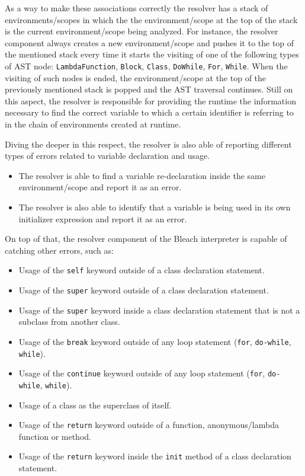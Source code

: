 As a way to make these associations correctly the resolver has a stack of environments/scopes in which the the environment/scope at the top of the stack is the current environment/scope being analyzed. For instance, the resolver component always creates a new environment/scope and pushes it to the top of the mentioned stack every time it starts the visiting of one of the following types of AST node: \texttt{LambdaFunction}, \texttt{Block}, \texttt{Class}, \texttt{DoWhile}, \texttt{For}, \texttt{While}. When the visiting of such nodes is ended, the environment/scope at the top of the previously mentioned stack is popped and the AST traversal continues. Still on this aspect, the resolver is responsible for providing the runtime the information necessary to find the correct variable to which a certain identifier is referring to in the chain of environments created at runtime.

Diving the deeper in this respect, the resolver is also able of reporting different types of errors related to variable declaration and usage.
\begin{itemize}
    \item The resolver is able to find a variable re-declaration inside the same environment/scope and report it as an error.
    \item The resolver is also able to identify that a variable is being used in its own initializer expression and report it as an error.   
\end{itemize}

On top of that, the resolver component of the Bleach interpreter is capable of catching other errors, such as:
\begin{itemize}
    \item Usage of the \texttt{self} keyword outside of a class declaration statement.
    \item Usage of the \texttt{super} keyword outside of a class declaration statement.
    \item Usage of the \texttt{super} keyword inside a class declaration statement that is not a subclass from another class.
    \item Usage of the \texttt{break} keyword outside of any loop statement (\texttt{for}, \texttt{do-while}, \texttt{while}).
    \item Usage of the \texttt{continue} keyword outside of any loop statement (\texttt{for}, \texttt{do-while}, \texttt{while}).
    \item Usage of a class as the superclass of itself.
    \item Usage of the \texttt{return} keyword outside of a function, anonymous/lambda function or method.
    \item Usage of the \texttt{return} keyword inside the \texttt{init} method of a class declaration statement.
\end{itemize}

